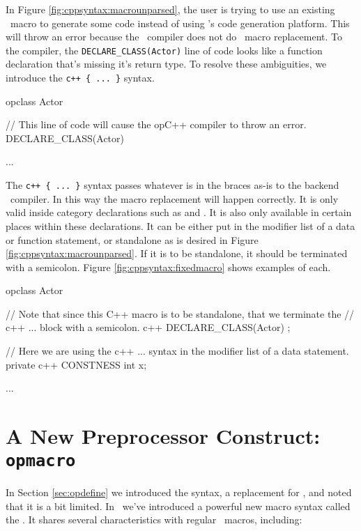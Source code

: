 {In Figure \ref{fig:cppsyntax:macrounparsed}, the user is trying to use an existing \cpp\ macro to generate some code instead of using \opCPP's code generation platform.  This will throw an error because the \opCPP\ compiler does not do \cpp\ macro replacement.  To the compiler, the {\tt DECLARE\_CLASS(Actor)} line of code looks like a function declaration that's missing it's return type.  To resolve these ambiguities, we introduce the {\tt c++ \{ ... \}} syntax.

\begin{opcpp}[label={fig:cppsyntax:macrounparsed},caption={The problem of using \cpp\ macros inside category declarations.}]
opclass Actor
{
    // This line of code will cause the opC++ compiler to throw an error.
    DECLARE_CLASS(Actor)

    ...
}
\end{opcpp}

The {\tt c++ \{ ... \}} syntax passes whatever is in the braces as-is to the backend \cpp\ compiler.  In this way the macro replacement will happen correctly.  It is only valid inside category declarations such as  and .  It is also only available in certain places within these declarations.  It can be either put in the modifier list of a data or function statement, or standalone as is desired in Figure \ref{fig:cppsyntax:macrounparsed}.  If it is to be standalone, it should be terminated with a semicolon.  Figure \ref{fig:cppsyntax:fixedmacro} shows examples of each.

\begin{opcpp}[label={fig:cppsyntax:fixedmacro},caption={Using the {\tt c++ \{ ... \}} syntax correctly.}]
opclass Actor
{
    // Note that since this C++ macro is to be standalone, that we terminate the 
    // c++ { ... } block with a semicolon.
    c++ { DECLARE_CLASS(Actor) };

    // Here we are using the c++ { ... } syntax in the modifier list of a data statement.
    private c++ { CONSTNESS } int x;

    ...
}
\end{opcpp}

\section{A New Preprocessor Construct: {\tt opmacro}}
\label{sec:opmacro}

In Section \ref{sec:opdefine} we introduced the  syntax, a replacement for , and noted that it is a bit limited.  In \opCPP\ we've introduced a powerful new macro syntax called the .  It shares several characteristics with regular \cpp\ macros, including:

}
